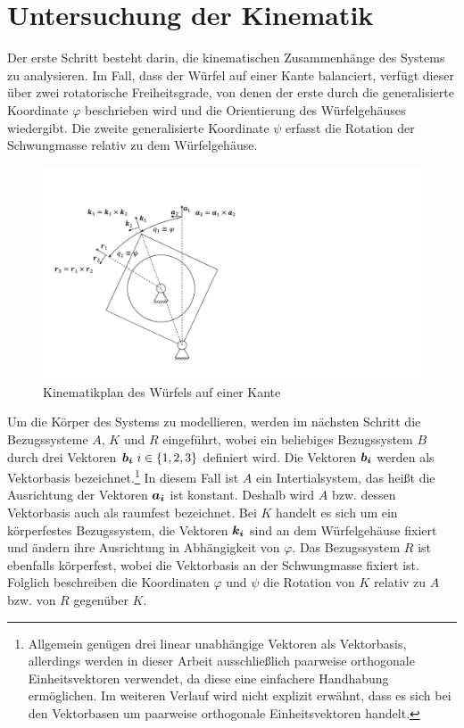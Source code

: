 \section{Untersuchung der Kinematik}
Der erste Schritt besteht darin, die kinematischen Zusammenhänge des Systems zu analysieren. Im Fall, dass der Würfel auf einer Kante balanciert, verfügt dieser über zwei rotatorische Freiheitsgrade, von denen der erste durch die generalisierte Koordinate $\varphi$ beschrieben wird und die Orientierung des Würfelgehäuses wiedergibt. Die zweite generalisierte Koordinate $\psi$ erfasst die Rotation der Schwungmasse relativ zu dem Würfelgehäuse.
\begin{figure}[!ht]
\centering
\includegraphics[width=0.6\linewidth, trim={1cm 1.5cm 18cm 3.5cm}, clip]{img/ModellWuerfelseite}
\caption{Kinematikplan des Würfels auf einer Kante}
\label{skizze_dynamik_edge}
\end{figure}

Um die Körper des Systems zu modellieren, werden im nächsten Schritt die Bezugssysteme $A$, $K$ und $R$ eingeführt, wobei ein beliebiges Bezugssystem $B$ durch drei Vektoren $\boldsymbol{b_i} \ i \in \{1,2,3\}$ definiert wird. Die Vektoren $\boldsymbol{b_i}$ werden als Vektorbasis bezeichnet.\footnote{Allgemein genügen drei linear unabhängige Vektoren als Vektorbasis, allerdings werden in dieser Arbeit ausschließlich paarweise orthogonale Einheitsvektoren verwendet, da diese eine einfachere Handhabung ermöglichen. Im weiteren Verlauf wird nicht explizit erwähnt, dass es sich bei den Vektorbasen um paarweise orthogonale Einheitsvektoren handelt.} In diesem Fall ist $A$ ein Intertialsystem, das heißt die Ausrichtung der Vektoren $\boldsymbol{a_i}$ ist konstant. Deshalb wird $A$ bzw. dessen Vektorbasis auch als raumfest bezeichnet. Bei $K$ handelt es sich um ein körperfestes Bezugssystem, die Vektoren $\boldsymbol{k_i}$ sind an dem Würfelgehäuse fixiert und ändern ihre Ausrichtung in Abhängigkeit von $\varphi$. Das Bezugssystem $R$ ist ebenfalls körperfest, wobei die Vektorbasis an der Schwungmasse fixiert ist. Folglich beschreiben die Koordinaten $\varphi$ und $\psi$ die Rotation von $K$ relativ zu $A$ bzw. von $R$ gegenüber $K$. 

